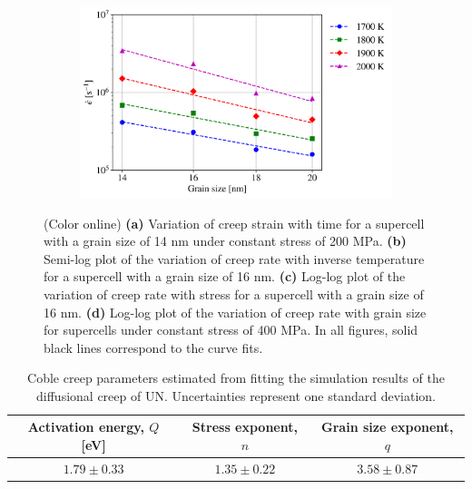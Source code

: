 \documentclass[preprint, 12pt]{elsarticle}
\newcommand{\?}{\stackrel{?}{=}}
\begin{document}
\begin{figure}[h!]
\begin{subfigure}{0.48\textwidth}
    \caption{}
    \label{Fig:strain-rate-vs-stress-16-nm}
\end{subfigure}
\hfill
\begin{subfigure}{0.48\textwidth}
    \includegraphics[width=\textwidth]{strain-rate-vs-grain-size-0.4-MPa.png}
    \caption{}
    \label{Fig:strain-rate-vs-grain-size-400-MPa}
\end{subfigure}
\caption{(Color online) \textbf{(a)} Variation of creep strain with time for a supercell with a grain size of 14 nm under constant stress of 200 MPa. \textbf{(b)} Semi-log plot of the variation of creep rate with inverse temperature for a supercell with a grain size of 16 nm. \textbf{(c)} Log-log plot of the variation of creep rate with stress for a supercell with a grain size of 16 nm. \textbf{(d)} Log-log plot of the variation of creep rate with grain size for supercells under constant stress of 400 MPa. In all figures, solid black lines correspond to the curve fits.}
\label{Fig:Creep}
\end{figure}

\begin{table}[h]
\centering
\caption{Coble creep parameters estimated from fitting the simulation results of the diffusional creep of UN. Uncertainties represent one standard deviation.}
\footnotesize
\begin{tabular}{ccc}
\hline
Activation energy, $Q$ [eV] & Stress exponent, $n$ & Grain size exponent, $q$ \\
\hline
$1.79 \pm 0.33$             & $1.35 \pm 0.22$      & $3.58 \pm 0.87$ \\
\hline
\end{tabular}
\label{Tab:CreepParams}
\end{table}
\end{document}
